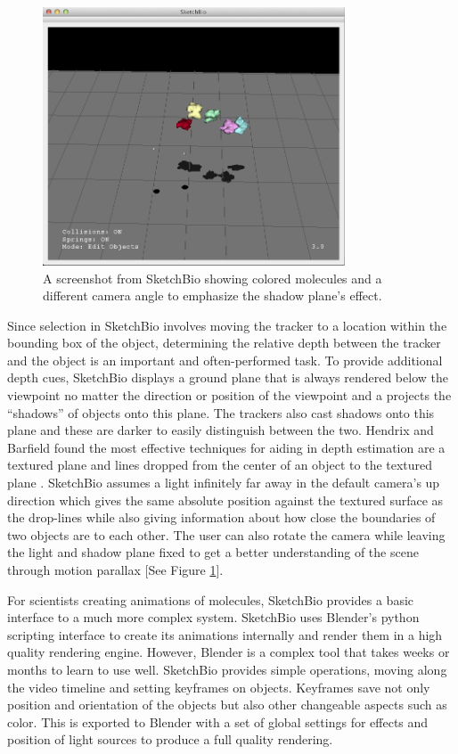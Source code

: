 \documentclass{article} %
\begin{document}
\begin{figure}[h]
\centering
\includegraphics[width=0.8\textwidth]{shadow_plane.png}
\caption{A screenshot from SketchBio showing colored molecules and a different camera angle to emphasize the shadow plane's effect.}
\label{fig:shadow_plane}
\end{figure}

Since selection in SketchBio involves moving the tracker to a location within the bounding box of the object, determining the relative depth between the tracker and the object is an important and often-performed task.  To provide additional depth cues, SketchBio displays a ground plane that is always rendered below the viewpoint no matter the direction or position of the viewpoint and a projects the “shadows” of objects onto this plane.  The trackers also cast shadows onto this plane and these are darker to easily distinguish between the two.  Hendrix and Barfield found the most effective techniques for aiding in depth estimation are a textured plane and lines dropped from the center of an object to the textured plane \cite{Hendrix1995103}.  SketchBio assumes a light infinitely far away in the default camera’s up direction which gives the same absolute position against the textured surface as the drop-lines while also giving information about how close the boundaries of two objects are to each other.  The user can also rotate the camera while leaving the light and shadow plane fixed to get a better understanding of the scene through motion parallax [See Figure \ref{fig:shadow_plane}].

For scientists creating animations of molecules, SketchBio provides a basic interface to a much more complex system.  SketchBio uses Blender’s python scripting interface to create its animations internally and render them in a high quality rendering engine.  However, Blender is a complex tool that takes weeks or months to learn to use well.  SketchBio provides simple operations, moving along the video timeline and setting keyframes on objects.  Keyframes save not only position and orientation of the objects but also other changeable aspects such as color.  This is exported to Blender with a set of global settings for effects and position of light sources to produce a full quality rendering.
\end{document}
